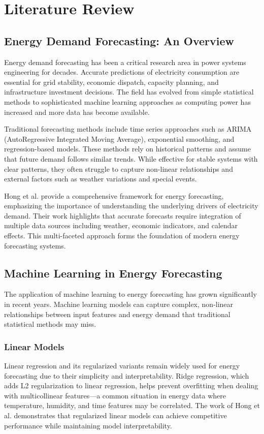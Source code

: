 \chapter{Literature Review}
    \section{Energy Demand Forecasting: An Overview}
        Energy demand forecasting has been a critical research area in power systems engineering for decades. Accurate predictions of electricity consumption are essential for grid stability, economic dispatch, capacity planning, and infrastructure investment decisions. The field has evolved from simple statistical methods to sophisticated machine learning approaches as computing power has increased and more data has become available.

        Traditional forecasting methods include time series approaches such as ARIMA (AutoRegressive Integrated Moving Average), exponential smoothing, and regression-based models. These methods rely on historical patterns and assume that future demand follows similar trends. While effective for stable systems with clear patterns, they often struggle to capture non-linear relationships and external factors such as weather variations and special events.

        Hong et al. \cite{hong2016probabilistic} provide a comprehensive framework for energy forecasting, emphasizing the importance of understanding the underlying drivers of electricity demand. Their work highlights that accurate forecasts require integration of multiple data sources including weather, economic indicators, and calendar effects. This multi-faceted approach forms the foundation of modern energy forecasting systems.

    \section{Machine Learning in Energy Forecasting}
        The application of machine learning to energy forecasting has grown significantly in recent years. Machine learning models can capture complex, non-linear relationships between input features and energy demand that traditional statistical methods may miss.

        \subsection{Linear Models}
        Linear regression and its regularized variants remain widely used for energy forecasting due to their simplicity and interpretability. Ridge regression, which adds L2 regularization to linear regression, helps prevent overfitting when dealing with multicollinear features—a common situation in energy data where temperature, humidity, and time features may be correlated. The work of Hong et al. \cite{hong2015glternet} demonstrates that regularized linear models can achieve competitive performance while maintaining model interpretability.

